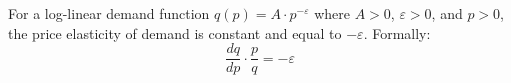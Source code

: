 
\begin{claim}
For a log-linear demand function $q(p) = A \cdot p^{-\varepsilon}$ where $A > 0$,
$\varepsilon > 0$, and $p > 0$, the price elasticity of demand is constant and equal
to $-\varepsilon$. Formally:
\[
  \frac{dq}{dp} \cdot \frac{p}{q} = -\varepsilon
\]
\end{claim}
